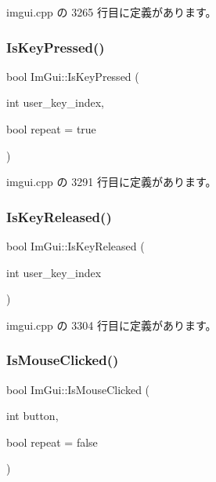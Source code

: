 imgui.\+cpp の 3265 行目に定義があります。

\mbox{\label{namespace_im_gui_a83331a8afa5316bc98ed9c98b151ac01}} 
\subsubsection{\texorpdfstring{Is\+Key\+Pressed()}{IsKeyPressed()}}
{\footnotesize\ttfamily bool Im\+Gui\+::\+Is\+Key\+Pressed (\begin{DoxyParamCaption}\item[{int}]{user\+\_\+key\+\_\+index,  }\item[{bool}]{repeat = {\ttfamily true} }\end{DoxyParamCaption})}



 imgui.\+cpp の 3291 行目に定義があります。

\mbox{\label{namespace_im_gui_a3fb25247181c5c292fe4f932bd20de88}} 
\subsubsection{\texorpdfstring{Is\+Key\+Released()}{IsKeyReleased()}}
{\footnotesize\ttfamily bool Im\+Gui\+::\+Is\+Key\+Released (\begin{DoxyParamCaption}\item[{int}]{user\+\_\+key\+\_\+index }\end{DoxyParamCaption})}



 imgui.\+cpp の 3304 行目に定義があります。

\mbox{\label{namespace_im_gui_a22b689cf4cf519590c2e2ad4f5462f29}} 
\subsubsection{\texorpdfstring{Is\+Mouse\+Clicked()}{IsMouseClicked()}}
{\footnotesize\ttfamily bool Im\+Gui\+::\+Is\+Mouse\+Clicked (\begin{DoxyParamCaption}\item[{int}]{button,  }\item[{bool}]{repeat = {\ttfamily false} }\end{DoxyParamCaption})}



